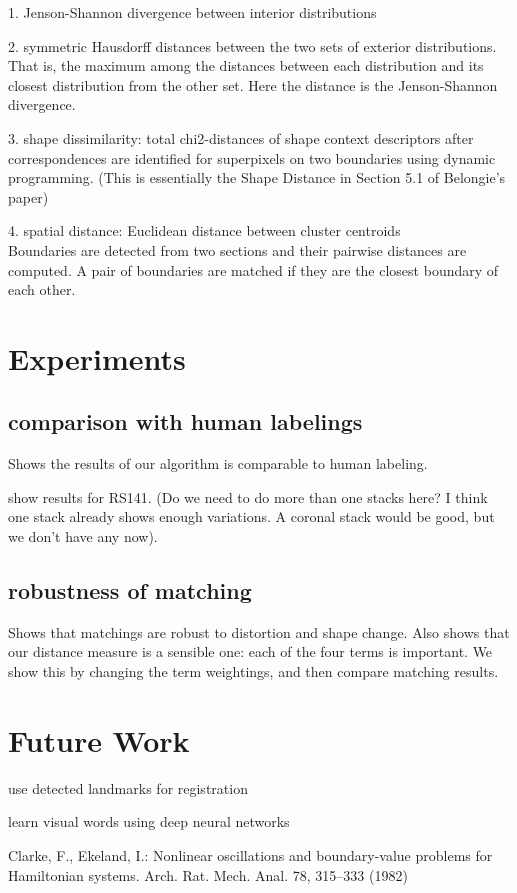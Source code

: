 \documentclass{llncs}
\begin{document}
1. Jenson-Shannon divergence between interior distributions

2. symmetric Hausdorff distances between the two sets of exterior distributions. That is, the maximum among the distances between each distribution and its closest distribution from the other set. Here the distance is the Jenson-Shannon divergence.

3. shape dissimilarity: total chi2-distances of shape context descriptors after correspondences are identified for superpixels on two boundaries using dynamic programming. (This is essentially the Shape Distance in Section 5.1 of Belongie's paper)

4. spatial distance: Euclidean distance between cluster centroids
\\

Boundaries are detected from two sections and their pairwise distances are computed. A pair of boundaries are matched if they are the closest boundary of each other.

\section{Experiments}

\subsection{comparison with human labelings}

Shows the results of our algorithm is comparable to human labeling.

show results for RS141. (Do we need to do more than one stacks here? I think one stack already shows enough variations. A coronal stack would be good, but we don't have any now).

\subsection{robustness of matching}

Shows that matchings are robust to distortion and shape change.
Also shows that our distance measure is a sensible one: each of the four terms is important. We show this by changing the term weightings, and then compare matching results.

\section{Future Work}

use detected landmarks for registration

learn visual words using deep neural networks


%
%
\begin{thebibliography}{5}
%
Clarke, F., Ekeland, I.:
Nonlinear oscillations and
boundary-value problems for Hamiltonian systems.
Arch. Rat. Mech. Anal. 78, 315--333 (1982)

\end{thebibliography}
\end{document}
